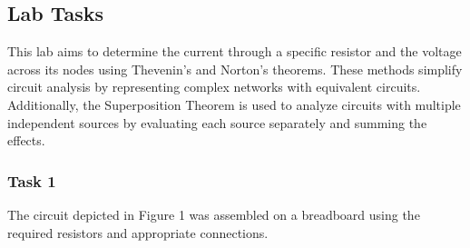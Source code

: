 \documentclass{article}
\begin{document}
\newpage



\subsection{Lab Tasks}

This lab aims to determine the current through a specific resistor and the voltage across its nodes using Thevenin’s and Norton’s theorems. These methods simplify circuit analysis by representing complex networks with equivalent circuits. Additionally, the Superposition Theorem is used to analyze circuits with multiple independent sources by evaluating each source separately and summing the effects.
\subsubsection{Task 1}

The circuit depicted in Figure 1 was assembled on a breadboard using the required resistors and appropriate connections.
\end{document}
